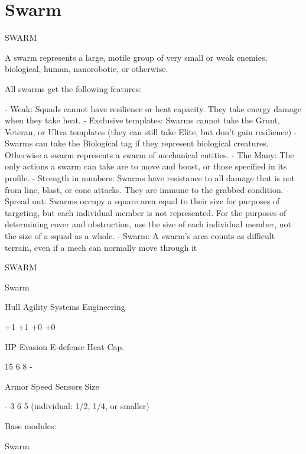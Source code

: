 \section{Swarm}
                                                   SWARM  

A swarm represents a large, motile group of very small or weak enemies, biological, human,  
nanorobotic, or otherwise.  

All swarms get the following features:
 
    -    Weak: Squads cannot have resilience or heat capacity. They take energy damage when  
         they take heat.  
    -    Exclusive templates: Swarms cannot take the Grunt, Veteran, or Ultra templates (they  
         can still take Elite, but don’t gain resilience)  
    -    Swarms can take the Biological tag if they represent biological creatures. Otherwise a  
         swarm represents a swarm of mechanical entities.  
    -    The Many: The only actions a swarm can take are to move and boost, or those specified  
         in its profile.  
    -    Strength in numbers: Swarms have resistance to all damage that is not from line, blast,  
         or cone attacks. They are immune to the grabbed condition.  
    -    Spread out: Swarms occupy a square area equal to their size for purposes of targeting,  
         but each individual member is not represented. For the purposes of determining cover  
         and obstruction, use the size of each individual member, not the size of a squad as a  
         whole.  
    -    Swarm: A swarm’s area counts as difficult terrain, even if a mech can normally move  
         through it  

       SWARM 

       Swarm 

       Hull       Agility      Systems       Engineering 

       +1         +1           +0            +0 

       HP         Evasion      E-defense     Heat Cap. 

       15         6            8             - 

       Armor      Speed        Sensors       Size 

       -          3            6             5 (individual:  
                                             1/2, 1/4, or  
                                             smaller) 

Base modules:
 
Swarm
 
